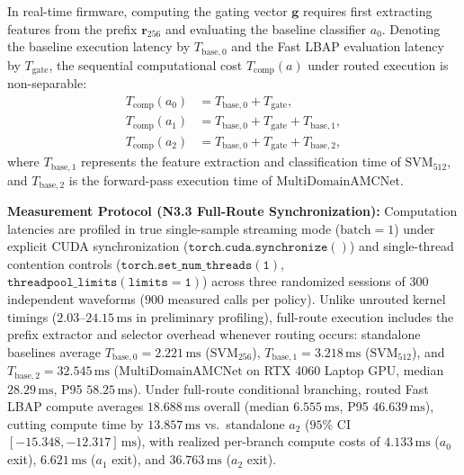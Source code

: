 In real-time firmware, computing the gating vector $\mathbf{g}$ requires first extracting features from the prefix $\mathbf{r}_{256}$ and evaluating the baseline classifier $a_0$. Denoting the baseline execution latency by $T_{\mathrm{base}, 0}$ and the Fast LBAP evaluation latency by $T_{\mathrm{gate}}$, the sequential computational cost $T_{\mathrm{comp}}(a)$ under routed execution is non-separable:
\begin{align}
    T_{\mathrm{comp}}(a_0) &= T_{\mathrm{base}, 0} + T_{\mathrm{gate}}, \label{eq:t_comp_a0} \\
    T_{\mathrm{comp}}(a_1) &= T_{\mathrm{base}, 0} + T_{\mathrm{gate}} + T_{\mathrm{base}, 1}, \label{eq:t_comp_a1} \\
    T_{\mathrm{comp}}(a_2) &= T_{\mathrm{base}, 0} + T_{\mathrm{gate}} + T_{\mathrm{base}, 2}, \label{eq:t_comp_a2}
\end{align}
where $T_{\mathrm{base}, 1}$ represents the feature extraction and classification time of $\mathrm{SVM}_{512}$, and $T_{\mathrm{base}, 2}$ is the forward-pass execution time of $\mathrm{MultiDomainAMCNet}$.

\textbf{Measurement Protocol (N3.3 Full-Route Synchronization):} Computation latencies are profiled in true single-sample streaming mode ($\text{batch}=1$) under explicit CUDA synchronization ($\mathtt{torch.cuda.synchronize()}$) and single-thread contention controls ($\mathtt{torch.set\_num\_threads(1)}$, $\mathtt{threadpool\_limits(limits=1)}$) across three randomized sessions of $300$ independent waveforms ($900$ measured calls per policy). Unlike unrouted kernel timings ($2.03\text{--}24.15\,\mathrm{ms}$ in preliminary profiling), full-route execution includes the prefix extractor and selector overhead whenever routing occurs: standalone baselines average $T_{\mathrm{base}, 0} = 2.221\,\mathrm{ms}$ ($\mathrm{SVM}_{256}$), $T_{\mathrm{base}, 1} = 3.218\,\mathrm{ms}$ ($\mathrm{SVM}_{512}$), and $T_{\mathrm{base}, 2} = 32.545\,\mathrm{ms}$ ($\mathrm{MultiDomainAMCNet}$ on RTX 4060 Laptop GPU, median $28.29\,\mathrm{ms}$, P95 $58.25\,\mathrm{ms}$). Under full-route conditional branching, routed Fast LBAP compute averages $18.688\,\mathrm{ms}$ overall (median $6.555\,\mathrm{ms}$, P95 $46.639\,\mathrm{ms}$), cutting compute time by $13.857\,\mathrm{ms}$ vs.\ standalone $a_2$ ($95\%$ CI $[-15.348, -12.317]\,\mathrm{ms}$), with realized per-branch compute costs of $4.133\,\mathrm{ms}$ ($a_0$ exit), $6.621\,\mathrm{ms}$ ($a_1$ exit), and $36.763\,\mathrm{ms}$ ($a_2$ exit).

